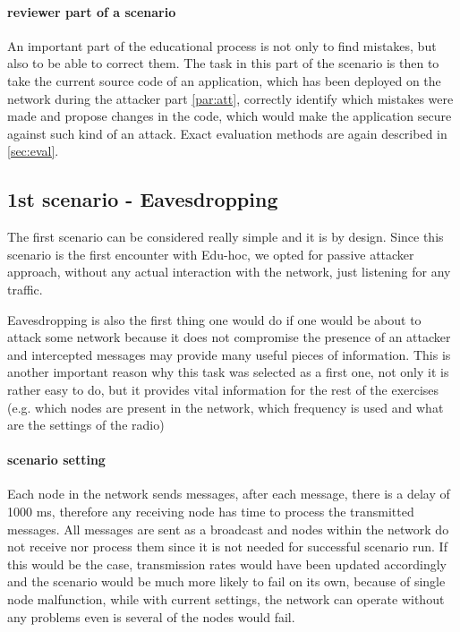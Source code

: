 \documentclass[
  print, %
  Table,   %
  nolof,     %
  nolot,     %
           oneside
]{fithesis3}
\begin{document}
  \paragraph{reviewer part of a scenario}
    An important part of the educational process is not only to find mistakes, but also to be able to correct them. The task in this part of the scenario is then to take the current source code of an application, which has been deployed on the network during the attacker part \ref{par:att}, correctly identify which mistakes were made and propose changes in the code, which would make the application secure against such kind of an attack. Exact evaluation methods are again described in \ref{sec:eval}.


    \subsection{1st scenario - Eavesdropping}\label{subsec:1st}
    The first scenario can be considered really simple and it is by design. Since this scenario is the first encounter with Edu-hoc, we opted for passive attacker approach, without any actual interaction with the network, just listening for any traffic.

    Eavesdropping is also the first thing one would do if one would be about to attack some network because it does not compromise the presence of an attacker and intercepted messages may provide many useful pieces of information. This is another important reason why this task was selected as a first one, not only it is rather easy to do, but it provides vital information for the rest of the exercises (e.g. which nodes are present in the network, which frequency is used and what are the settings of the radio)

    \paragraph{scenario setting}
    Each node in the network sends messages, after each message, there is a delay of 1000 ms, therefore any receiving node has time to process the transmitted messages. All messages are sent as a broadcast and nodes within the network do not receive nor process them since it is not needed for successful scenario run. If this would be the case, transmission rates would have been updated accordingly and the scenario would be much more likely to fail on its own, because of single node malfunction, while with current settings, the network can operate without any problems even is several of the nodes would fail.
\end{document}
